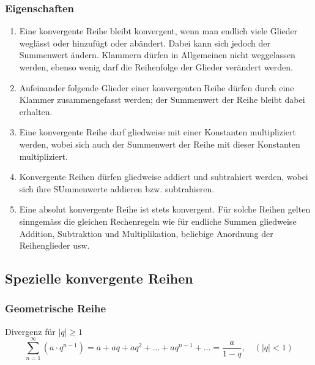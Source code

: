 \subsubsection{Eigenschaften}
\begin{enumerate}[$(a)$]
\item Eine konvergente Reihe bleibt konvergent, wenn man endlich viele Glieder weglässt oder hinzufügt oder abändert. Dabei kann sich jedoch der Summenwert ändern. Klammern dürfen in Allgemeinen nicht weggelassen werden, ebenso wenig darf die Reihenfolge der Glieder verändert werden.
\item Aufeinander folgende Glieder einer konvergenten Reihe dürfen durch eine Klammer zusammengefasst werden; der Summenwert der Reihe bleibt dabei erhalten.
\item Eine konvergente Reihe darf gliedweise mit einer Konstanten multipliziert werden, wobei sich auch der Summenwert der Reihe mit dieser Konstanten multipliziert.
\item Konvergente Reihen dürfen gliedweise addiert und subtrahiert werden, wobei sich ihre SUmmenwerte addieren bzw. subtrahieren.
\item Eine absolut konvergente Reihe ist stets konvergent. Für solche Reihen gelten sinngemäss die gleichen Rechenregeln wie für endliche Summen gliedweise Addition, Subtraktion und Multiplikation, beliebige Anordnung der Reihenglieder usw.
\end{enumerate}
\subsection{Spezielle konvergente Reihen}
\subsubsection{Geometrische Reihe}
Divergenz für $\Big\vert q\Big\vert\geq 1$
\begin{equation}
\boxed{\displaystyle \sum_{n=1}^{\infty}\left(a\cdot q^{n-1}\right)=a+aq+aq^2+\dotso+aq^{n-1}+\dotso=\dfrac{a}{1-q},\quad \left(\Big\vert q\Big\vert<1\right)}
\end{equation}
